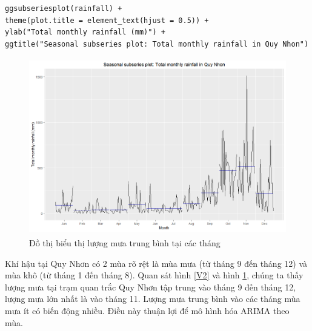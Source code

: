 \documentclass[12pt, a4paper,oneside]{book}
\theoremstyle{definition}
\begin{document}
\begin{lstlisting}
ggsubseriesplot(rainfall) +
theme(plot.title = element_text(hjust = 0.5)) + 
ylab("Total monthly rainfall (mm)") +
ggtitle("Seasonal subseries plot: Total monthly rainfall in Quy Nhon")
\end{lstlisting}
\begin{figure}[!htb]
	\centering
	\includegraphics[width=1\linewidth,height=7.7cm]{anh/V4}
	\vskip-4mm 
	\caption{Đồ thị biểu thị lượng mưa trung bình tại các tháng}  
	\label{V4}
\end{figure}
Khí hậu tại Quy Nhơn có 2 mùa rõ rệt là mùa mưa (từ tháng 9 đến tháng 12) và mùa khô (từ tháng 1 đến tháng 8). Quan sát hình \ref{V2} và hình \ref{V4}, chúng ta thấy lượng mưa tại trạm quan trắc Quy Nhơn tập trung vào tháng 9 đến tháng 12, lượng mưa lớn nhất là vào tháng 11. Lượng mưa trung bình vào các tháng mùa mưa ít có biến động nhiều. Điều này thuận lợi để mô hình hóa ARIMA theo mùa.
\end{document}
